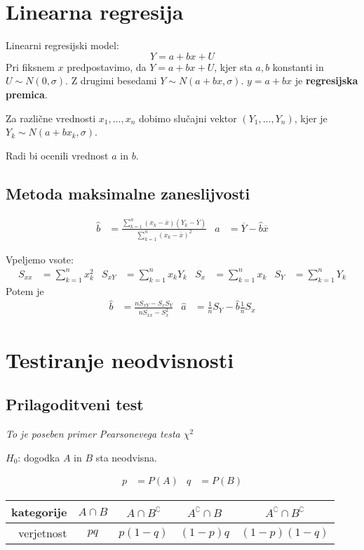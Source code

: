 \begin{multicols}{5}
\section{Linearna regresija }

Linearni regresijski model:
\[ Y = a + bx + U\]
Pri fiksnem $x$ predpostavimo, da $Y = a + bx + U$, kjer sta $a, b$ konstanti in $U \sim N(0, \sigma)$. 
Z drugimi besedami $Y \sim N(a+bx, \sigma)$. $y = a+bx$ je \textbf{regresijska premica}.

Za različne vrednosti $x_1, \dots, x_n$ dobimo slučajni vektor $(Y_1, \dots, Y_n)$, kjer je $Y_k \sim N(a+bx_k, \sigma)$.

Radi bi ocenili vrednost $a$ in $b$.

\subsection{Metoda maksimalne zaneslijvosti}
\begin{align*}
    \hat{b} &= \frac{\sum_{k=1}^n (x_k - \overline{x})(Y_k - \overline{Y})}{\sum_{k=1}^n (x_k - \overline{x})^2} &
    \hat{a} &= \overline{Y} - \hat{b}\overline{x}
\end{align*}

Vpeljemo vsote:
{\small
\begin{align*}
    S_{xx} &= \sum_{k=1}^n x_k^2 &
    S_{xY} &= \sum_{k=1}^n x_k Y_k &
    S_{x} &= \sum_{k=1}^n x_k &
    S_{Y} &= \sum_{k=1}^n Y_k
\end{align*}}
Potem je
\begin{align*}
    \hat{b} &= \frac{n S_{xY} - S_x S_Y}{nS_{xx} - S_x^2} &
    \hat{a} &= \frac{1}{n} S_Y - \hat{b} \frac{1}{n} S_x
\end{align*}


\section{Testiranje neodvisnosti}
\subsection{Prilagoditveni test}
\textit{To je poseben primer Pearsonevega testa $\chi^2$}

$H_0$: dogodka $A$ in $B$ sta neodvisna.

\begin{align*}
    p &= P(A) &  q &= P(B)
\end{align*}
\begin{center}
    \begin{tabular}{r | c c c c}
        kategorije & $A \cap B$ & $A \cap B^\complement$ & $A^\complement \cap B$ & $A^\complement \cap B^\complement$ \\ \hline
        verjetnost & $pq$ & $p(1-q)$ & $(1-p)q$ & $(1-p)(1-q)$
    \end{tabular}
\end{center}


\end{multicols}
